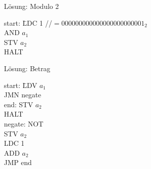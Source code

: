\begin{frame}{Lösung: Modulo 2}
	\begin{tabbing}
		start: \; \= LDC 1 \quad  //$= 000000000000000000000001_2$ \\
				\> AND $a_1$ \\
				\> STV $a_2$ \\
				\> HALT
	\end{tabbing}
\end{frame}

\begin{frame}{Lösung: Betrag}
	\begin{tabbing}
		start: \quad \= LDV $a_1$ \\
					 \> JMN negate \\
		end: 		 \> STV $a_2$ \\
					 \> HALT \\
		negate:		 \> NOT \\
					 \> STV $a_2$ \\
					 \> LDC 1 \\
					 \> ADD $a_2$  \\
					 \> JMP end	 \\		 
	\end{tabbing}
\end{frame}



